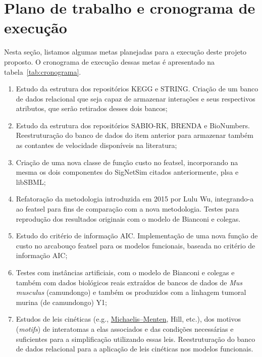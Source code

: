 \documentclass[12pt]{article}
\begin{document}

\section{Plano de trabalho e cronograma de execução}

Nesta seção, listamos algumas metas planejadas para a execução deste projeto proposto. O cronograma de execução dessas metas é apresentado na tabela~\ref{tab:cronograma}.

\begin{enumerate}

    \item Estudo da estrutura dos repositórios KEGG e STRING. Criação de um banco de dados relacional que seja capaz de armazenar interações e seus respectivos atributos, que serão retirados desses dois bancos;

    \item Estudo da estrutura dos repositórios SABIO-RK, BRENDA e BioNumbers. Reestruturação do banco de dados do item anterior para armazenar também as contantes de velocidade disponíveis na literatura;

    \item Criação de uma nova classe de função custo no featsel, incorporando na mesma os dois componentes do SigNetSim citados anteriormente, plsa e libSBML;

    \item Refatoração da metodologia introduzida em 2015 por Lulu Wu, integrando-a ao featsel para fins de comparação com a nova metodologia. Testes para reprodução dos resultados originais com o modelo de Bianconi e colegas.

    \item Estudo do critério de informação AIC. Implementação de uma nova função de custo no arcabouço featsel para os modelos funcionais, baseada no critério de informação AIC;

    \item Testes com instâncias artificiais, com o modelo de Bianconi e colegas e também com dados biológicos reais extraídos de bancos de dados de {\em Mus musculus} (camundongo) e também os produzidos com a linhagem tumoral murina (de camundongo) Y1; 

    \item Estudos de leis cinéticas (e.g., \href{https://en.wikipedia.org/wiki/Michaelis\%E2\%80\%93Menten\_kinetics}{Michaelis--Menten}, Hill, etc.), dos motivos ({\em motifs}) de interatomas a elas associados e das condições necessárias e suficientes para a simplificação utilizando essas leis. Reestruturação do banco de dados relacional para a aplicação de leis cinéticas nos modelos funcionais.


\end{enumerate}
\end{document}
